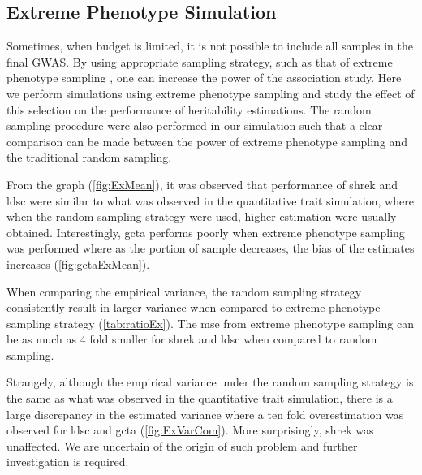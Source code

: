 		\subsection{Extreme Phenotype Simulation}
		
		Sometimes, when budget is limited, it is not possible to include all samples in the final \gls{GWAS}. 
		By using appropriate sampling strategy, such as that of extreme phenotype sampling \citep{Peloso2015}, one can increase the power of the association study.
		Here we perform simulations using extreme phenotype sampling and study the effect of this selection on the performance of heritability estimations.
		The random sampling procedure were also performed in our simulation such that a clear comparison can be made between the power of extreme phenotype sampling and the traditional random sampling.
		
		From the graph (\cref{fig:ExMean}), it was observed that performance of \gls{shrek} and \gls{ldsc} were similar to what was observed in the quantitative trait simulation, where when the random sampling strategy were used, higher estimation were usually obtained. 
		Interestingly, \gls{gcta} performs poorly when extreme phenotype sampling was performed where as the portion of sample decreases, the bias of the estimates increases (\cref{fig:gctaExMean}).
		
		When comparing the empirical variance, the random sampling strategy consistently result in  larger variance when compared to extreme phenotype sampling strategy (\cref{tab:ratioEx}).
		The \gls{mse} from extreme phenotype sampling can be as much as 4 fold smaller for \gls{shrek} and \gls{ldsc} when compared to random sampling.
		
		Strangely, although the empirical variance under the random sampling strategy is the same as what was observed in the quantitative trait simulation, there is a large discrepancy in the estimated variance where a ten fold overestimation was observed for \gls{ldsc} and \gls{gcta} (\cref{fig:ExVarCom}). 
		More surprisingly, \gls{shrek} was unaffected. 
		We are uncertain of the origin of such problem and further investigation is required.
		
